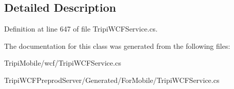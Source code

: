 \subsection{Detailed Description}


Definition at line 647 of file TripiWCFService.cs.

The documentation for this class was generated from the following files:\begin{DoxyCompactItemize}
\item 
TripiMobile/wcf/TripiWCFService.cs\item 
TripiWCFPreprodServer/Generated/ForMobile/TripiWCFService.cs\end{DoxyCompactItemize}
